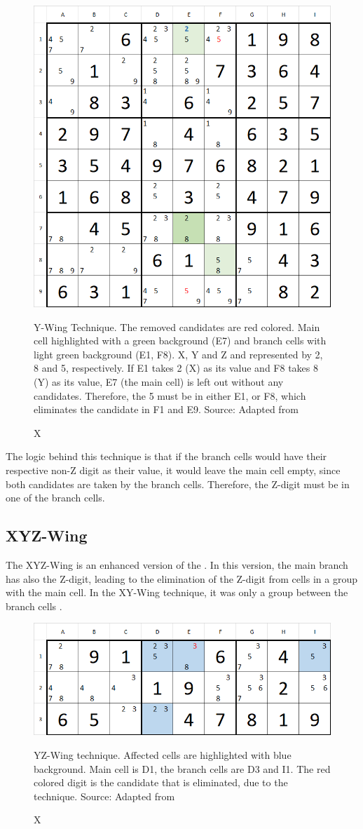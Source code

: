 \documentclass[twoside]{ausarbeitung}
\begin{document}
\begin{figure}[H]
  \centering
  \includegraphics[width=.55\linewidth]{images/xywing}
  \caption[XY-Wing] XY-Wing Technique. The removed candidates are red colored. Main cell highlighted with a green background (E7) and branch cells with light green background (E1, F8). X, Y and Z and represented by 2, 8 and 5, respectively. If E1 takes 2 (X) as its value and F8 takes 8 (Y) as its value, E7 (the main cell) is left out without any candidates. Therefore, the 5 must be in either E1, or F8, which eliminates the candidate in F1 and E9. Source: Adapted from \cite{SolvingS57:online}
  \label{fig:xywing}
\end{figure}%

The logic behind this technique is that if the branch cells would have their respective non-Z digit as their value, it would leave the main cell empty, since both candidates are taken by the branch cells. Therefore, the Z-digit must be in one of the branch cells. 


\subsection{XYZ-Wing}
The XYZ-Wing is an enhanced version of the . In this version, the main branch has also the Z-digit, leading to the elimination of the Z-digit from cells in a group with the main cell. In the XY-Wing technique, it was only a group between the branch cells \cite{XYZWingR68:online}.

\begin{figure}[H]
  \centering
  \includegraphics[width=.55\linewidth]{images/xyzwing}
  \caption[XYZ-Wing] XYZ-Wing technique. Affected cells are highlighted with blue background. Main cell is D1, the branch cells are D3 and I1. The red colored digit is the candidate that is eliminated, due to the technique.  Source: Adapted from \cite{XYZWingR68:online}
  \label{fig:xyzwing}
\end{figure}%
\end{document}
